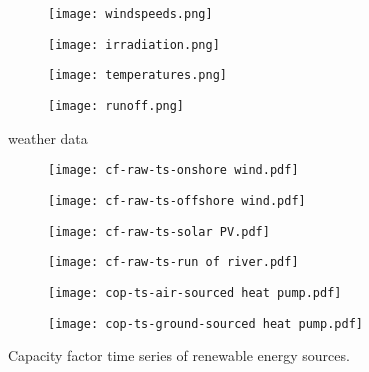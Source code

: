 \begin{figure}
    \centering
        \begin{subfigure}[t]{0.49\textwidth}
            \centering
        \texttt{[image: windspeeds.png]}
    \end{subfigure}
    \begin{subfigure}[t]{0.49\textwidth}
        \centering
        \texttt{[image: irradiation.png]}
    \end{subfigure}
    \begin{subfigure}[t]{0.49\textwidth}
        \centering
        \texttt{[image: temperatures.png]}
    \end{subfigure}
    \begin{subfigure}[t]{0.49\textwidth}
        \centering
        \texttt{[image: runoff.png]}
    \end{subfigure}
    \caption{weather data}
    \label{fig:weather-data}
\end{figure}


\begin{figure}
    \centering
        \begin{subfigure}[t]{0.49\textwidth}
            \centering
        \texttt{[image: cf-raw-ts-onshore wind.pdf]}
    \end{subfigure}
    \begin{subfigure}[t]{0.49\textwidth}
        \centering
        \texttt{[image: cf-raw-ts-offshore wind.pdf]}
    \end{subfigure}
    \begin{subfigure}[t]{0.49\textwidth}
        \centering
        \texttt{[image: cf-raw-ts-solar PV.pdf]}
    \end{subfigure}
    \begin{subfigure}[t]{0.49\textwidth}
        \centering
        \texttt{[image: cf-raw-ts-run of river.pdf]}
    \end{subfigure}
    \begin{subfigure}[t]{0.49\textwidth}
        \centering
        \texttt{[image: cop-ts-air-sourced heat pump.pdf]}
    \end{subfigure}
    \begin{subfigure}[t]{0.49\textwidth}
        \centering
        \texttt{[image: cop-ts-ground-sourced heat pump.pdf]}
    \end{subfigure}
    \caption{Capacity factor time series of renewable energy sources.}
    \label{fig:cfs-ts}
\end{figure}

